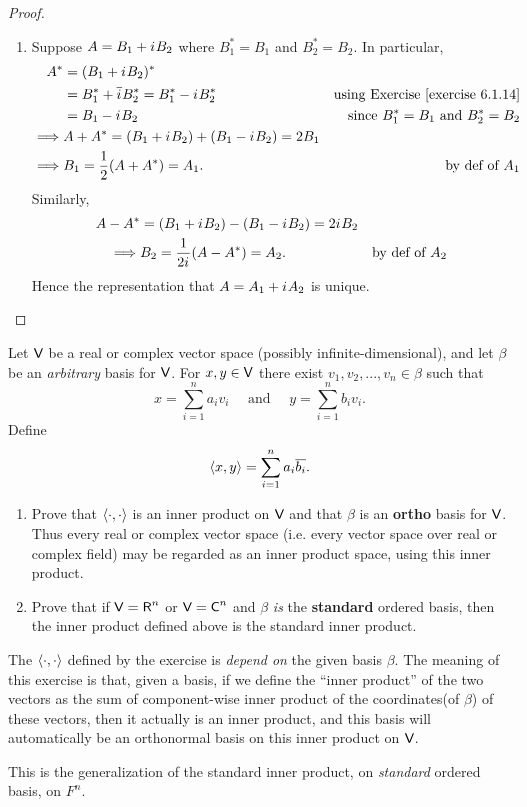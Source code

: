 \begin{proof}
\begin{enumerate}
\item Suppose \(A = B_1 + {i\mkern1mu} B_2\) where \(B_1^* = B_1\) and \(B_2^* = B_2\).
In particular,
\begin{align*}
    A^* & = (B_1 + \iu B_2)^* \\
        & = B_1^* + \conjugatet{\iu} B_2^* = B_1^* - \iu B_2^* & \text{using \EXEC{6.1.14}} \\
        & = B_1 - \iu B_2 & \text{since \(B_1^* = B_1\) and \(B_2^* = B_2\)} \\
    \implies & A + A^* = (B_1 + \iu B_2) + (B_1 - \iu B_2) = 2 B_1 \\
    \implies & B_1 = \frac{1}{2} (A + A^*) = A_1. & \text{by def of \(A_1\)}
\end{align*}
Similarly,
\begin{align*}
    A - A^* & = (B_1 + {i\mkern1mu} B_2) - (B_1 - {i\mkern1mu} B_2) = 2{i\mkern1mu} B_2 \\
    \implies & B_2 = \frac{1}{2{i\mkern1mu}} (A - A^*) = A_2. & \text{by def of \(A_2\)}
\end{align*}
Hence the representation that \(A = A_1 + {i\mkern1mu} A_2\) is unique.
\end{enumerate}
\end{proof}

\begin{exercise} \label{exercise 6.1.22}
Let \(\textsf{V}\) be a real or complex vector space (possibly infinite-dimensional), and let \(\beta\) be an \emph{arbitrary} basis for \(\textsf{V}\).
For \(x, y \in \textsf{V}\) there exist \(v_1, v_2, ..., v_n \in \beta\) such that
\[
    x = \sum_{i = 1}^n a_i v_i \quad \text{ and } \quad y = \sum_{i = 1}^n b_i v_i.
\]
Define
\[
    \left< x, y \right> = \sum_{i = 1}^n a_i \overline{b_i}.
\]
\begin{enumerate}
\item Prove that \(\left< \cdot, \cdot \right>\) is an inner product on \(\textsf{V}\) and that \(\beta\) is an \textbf{ortho} basis for \(\textsf{V}\).
Thus every real or complex vector space (i.e. every vector space over real or complex field) may be regarded as an inner product space, using this inner product.

\item Prove that if \(\textsf{V} = \textsf{R}^n\) or \(\textsf{V} = \textsf{C}^n\) and \(\beta\) \emph{is} the \textbf{standard} ordered basis, then the inner product defined above is the standard inner product.
\end{enumerate}
\end{exercise}

\begin{note}
The \(\left< \cdot, \cdot \right>\) defined by the exercise is \emph{depend on} the given basis \(\beta\).
The meaning of this exercise is that, given a basis, if we define the ``inner product'' of the two vectors as the sum of component-wise inner product of the coordinates(of \(\beta\)) of these vectors,
then it actually is an inner product, and this basis will automatically be an orthonormal basis on this inner product on \(\textsf{V}\).

This is the generalization of the standard inner product, on \emph{standard} ordered basis, on \(F^n\).
\end{note}

